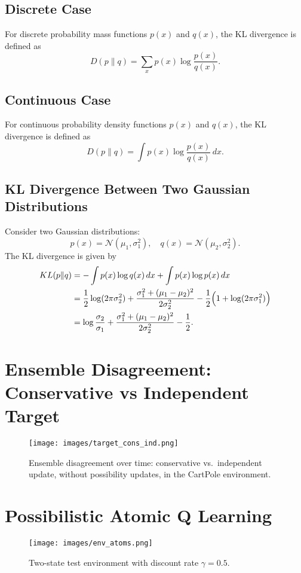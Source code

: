 \documentclass[11pt,a4paper]{report}
\begin{document}
\subsection*{Discrete Case}
For discrete probability mass functions \(p(x)\) and \(q(x)\), the KL divergence is defined as
\[
D(p\|q)= \sum_{x} p(x) \log \frac{p(x)}{q(x)}.
\]

\subsection*{Continuous Case}
For continuous probability density functions \(p(x)\) and \(q(x)\), the KL divergence is defined as
\[
D(p\|q)= \int p(x) \log \frac{p(x)}{q(x)}\, dx.
\]

\subsection*{KL Divergence Between Two Gaussian Distributions}
Consider two Gaussian distributions:
\[
p(x) = \mathcal{N}(\mu_1,\sigma_1^2), \quad q(x) = \mathcal{N}(\mu_2,\sigma_2^2).
\]
The KL divergence is given by
\[
\begin{aligned}
KL(p\|q) &= -\int p(x)\log q(x)\,dx + \int p(x)\log p(x)\,dx \\
&= \frac{1}{2}\log (2\pi\sigma_2^2) + \frac{\sigma_1^2+(\mu_1-\mu_2)^2}{2\sigma_2^2} - \frac{1}{2}\Bigl(1+\log(2\pi\sigma_1^2)\Bigr) \\
&= \log \frac{\sigma_2}{\sigma_1} + \frac{\sigma_1^2+(\mu_1-\mu_2)^2}{2\sigma_2^2} - \frac{1}{2}.
\end{aligned}
\]
\section*{Ensemble Disagreement: Conservative vs Independent Target} \label{appendix:ens-disagre}
\begin{figure}[H]
  \centering
  \texttt{[image: images/target\_cons\_ind.png]}
  \caption{Ensemble disagreement over time: conservative vs.\ independent update, without possibility updates, in the CartPole environment.}
\end{figure}
\section*{Possibilistic Atomic Q Learning} \label{appendix:atomic}

\begin{figure}[H]
  \centering
  \texttt{[image: images/env\_atoms.png]}
  \caption{Two-state test environment with discount rate \(\gamma = 0.5\).}
  \label{fig:testatom}
\end{figure}
\end{document}
